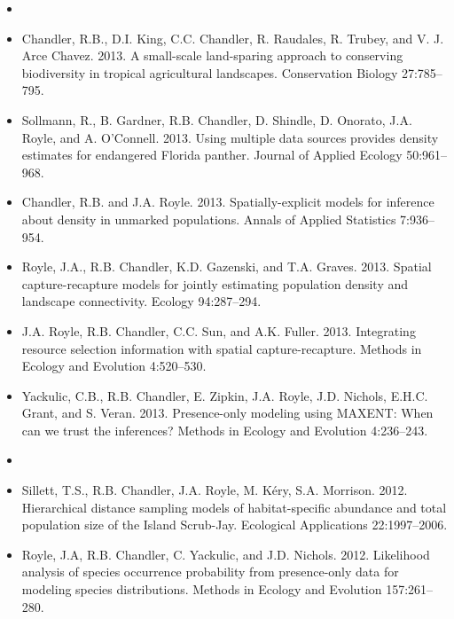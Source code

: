 \begin{itemize}

\item[] { \\}

\item Chandler, R.B., D.I. King, C.C. Chandler, R. Raudales,
  R. Trubey, and V. J. Arce Chavez. 2013. A small-scale
  land-sparing approach to conserving biodiversity in tropical
  agricultural landscapes. Conservation Biology 27:785--795. 

\item Sollmann, R., B. Gardner, R.B. Chandler, D. Shindle,
  D. Onorato, J.A. Royle, and A. O'Connell. 2013.
  Using multiple data sources provides density estimates for
  endangered Florida panther. Journal of Applied Ecology 50:961--968.

\item Chandler, R.B. and J.A. Royle. 2013.
  Spatially-explicit models for inference about density in unmarked
  populations. Annals of Applied Statistics 7:936--954.

\item Royle, J.A., R.B. Chandler, K.D. Gazenski, and
  T.A. Graves. 2013. Spatial capture-recapture models for jointly
  estimating population density and landscape connectivity. Ecology
  94:287--294. 

\item J.A. Royle, R.B. Chandler, C.C. Sun, and
  A.K. Fuller. 2013. Integrating resource selection information with
  spatial capture-recapture. Methods in Ecology and Evolution 4:520--530.

\item Yackulic, C.B., R.B. Chandler, E. Zipkin, J.A. Royle,
  J.D. Nichols, E.H.C. Grant, and S. Veran. 2013. Presence-only
  modeling using MAXENT: When can we trust the inferences? Methods in
  Ecology and Evolution 4:236--243. 

\item[] { \\}

\item Sillett, T.S., R.B. Chandler, J.A. Royle, M. K\'{e}ry,
  S.A. Morrison. 2012. Hierarchical distance sampling models of
  habitat-specific abundance and total population size of the Island
  Scrub-Jay. Ecological Applications 22:1997--2006.

\item Royle, J.A, R.B. Chandler, C. Yackulic, and
  J.D. Nichols. 2012. Likelihood analysis of species occurrence
  probability from presence-only data for modeling species
  distributions. Methods in Ecology and Evolution 157:261--280.


\end{itemize}
